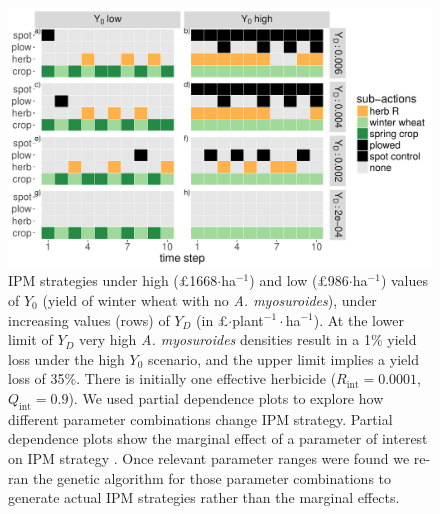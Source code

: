 \documentclass[9pt,twocolumn,twoside,lineno]{pnas-new}
\begin{document}
\begin{figure}
	\centering
	\includegraphics[width=1\linewidth]{MS_act_seq_YD_Y0.pdf}
	\caption{IPM strategies under high (\pounds 1668$\cdot$ha$^{-1}$) and low (\pounds 986$\cdot$ha$^{-1}$) values of $Y_0$ (yield of winter wheat with no \textit{A. myosuroides}), under increasing values (rows) of $Y_D$ (in \pounds$\cdot$plant$^{-1}\cdot$ha$^{-1}$). At the lower limit of $Y_D$ very high \textit{A. myosuroides} densities result in a 1\% yield loss under the high $Y_0$ scenario, and the upper limit implies a yield loss of 35\%. There is initially one effective herbicide ($R_\text{int} = 0.0001$, $Q_\text{int} = 0.9$). We used partial dependence plots to explore how different parameter combinations change IPM strategy. Partial dependence plots show the marginal effect of a parameter of interest on IPM strategy \citep{Frie2001, Mill2016}. Once relevant parameter ranges were found we re-ran the genetic algorithm for those parameter combinations to generate actual IPM strategies rather than the marginal effects.}
	\label{fig:Y0_YD} 
\end{figure}
\end{document}
